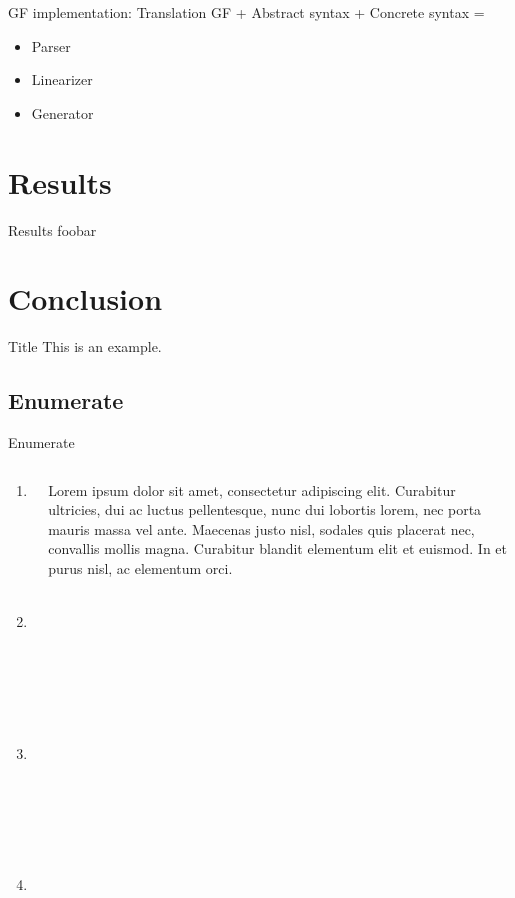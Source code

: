 \documentclass{beamer}
\begin{document}
\begin{frame}[fragile]{GF implementation: Translation}
GF + Abstract syntax + Concrete syntax = \pause
\begin{itemize}
\item Parser\pause
\item Linearizer\pause
\item Generator
\end{itemize}
\begin{semiverbatim}

\end{semiverbatim}
\end{frame}

\section{Results} 
\begin{frame}{Results} 
foobar
\end{frame}

\section{Conclusion} 
\begin{frame}{Title} 
  This is an example.
\end{frame}



\subsection{Enumerate}
\begin{frame}{Enumerate}
\begin{columns}
  \begin{column}{0.49\paperwidth}
      \begin{enumerate}
        \item Lorem ;
        \item<2-> Ipsum ;
        \item<2-> Dolor ;
        \item<2-> Sit amet.
      \end{enumerate}
  \end{column}

  \begin{column}{0.49\paperwidth}
    Lorem ipsum dolor sit amet, consectetur adipiscing elit. Curabitur 
    ultricies, dui ac luctus pellentesque, nunc dui lobortis lorem, nec 
    porta mauris massa vel ante. Maecenas justo nisl, sodales quis 
    placerat nec, convallis mollis magna. Curabitur blandit elementum 
    elit et euismod. In et purus nisl, ac elementum orci.
  \end{column}
\end{columns}

\end{frame}
\end{document}
